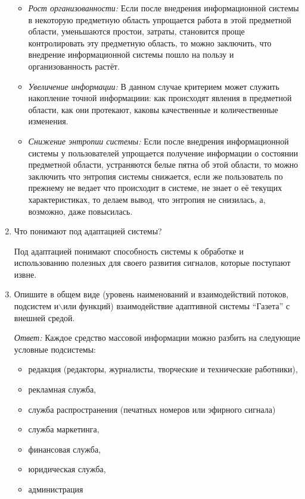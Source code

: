 \documentclass[10pt]{article}
\begin{document}
\begin{enumerate}
\begin{itemize}
  \item{\emph{Рост организованности:} Если после внедрения информационной системы в некоторую предметную область упрощается работа в этой предметной области, уменьшаются простои, затраты, становится проще контролировать эту предметную область, то можно заключить, что внедрение информационной системы пошло на пользу и организованность растёт.}

  \item{\emph{Увеличение информации:} В данном случае критерием может служить накопление точной информациии: как происходят явления в предметной области, как они протекают, каковы качественные и количественные изменения.}

    \item{\emph{Снижение энтропии системы:} Если после внедрения информационной системы у пользователей упрощается получение информации о состоянии предметной области, устраняются белые пятна об этой области, то можно заключить что энтропия системы снижается, если же пользователь по прежнему не ведает что происходит в системе, не знает о её текущих характеристиках, то делаем вывод, что энтропия не снизилась, а, возможно, даже повысилась.}
    \end{itemize}

  \item{Что понимают под адаптацией системы?}

    Под адаптацией понимают способность системы к обработке и использованию полезных для своего развития сигналов, которые поступают извне.

  \item{Опишите в общем виде (уровень наименований и взаимодействий потоков, подсистем и$\backslash$или функций) взаимодействие адаптивной системы ``Газета'' с внешней средой.}

    \emph{Ответ:} Каждое средство массовой информации можно разбить на следующие условные подсистемы:

    \begin{itemize}
    \item{редакция (редакторы, журналисты, творческие и технические работники),}
    \item{рекламная служба,}
    \item{служба распространения (печатных номеров или эфирного сигнала)}
    \item{служба маркетинга,}
    \item{финансовая служба,}
    \item{юридическая служба,}
    \item{администрация}
    \end{itemize}


\end{enumerate}
\end{document}
